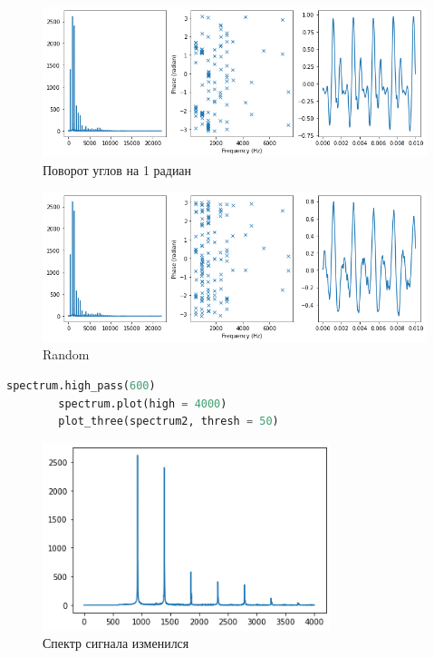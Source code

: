 \documentclass[a4paper, 12pt]{report}
\begin{document}
	\begin{figure}[H]
		\centering
		\includegraphics[width=1.0\textwidth]{test14.png}
		\caption{Поворот углов на 1 радиан}
		\label{fig:test14}
	\end{figure}
	\begin{figure}[H]
		\centering
		\includegraphics[width=1.0\textwidth]{test15.png}
		\caption{Random}
		\label{fig:test15}
	\end{figure}
	\begin{lstlisting}[language=Python,caption=Применили ФВЧ для сигнала]
		spectrum.high_pass(600)
		spectrum.plot(high = 4000)
		plot_three(spectrum2, thresh = 50)
	\end{lstlisting}
	\begin{figure}[H]
		\centering
		\includegraphics[width=0.75\textwidth]{test16.png}
		\caption{Спектр сигнала изменился}
		\label{fig:test16}
	\end{figure}
\end{document}
